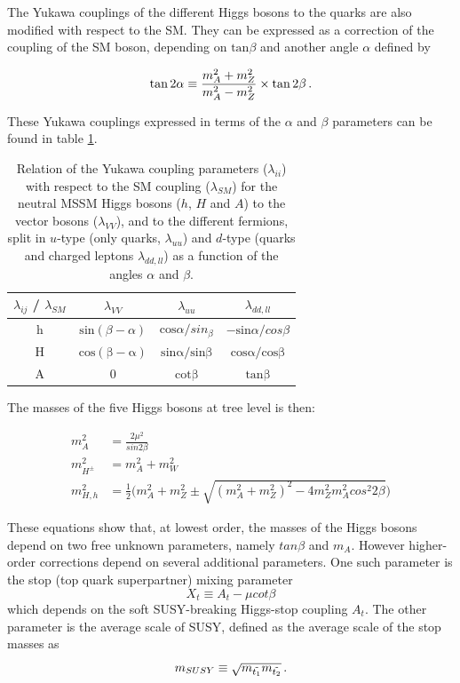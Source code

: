 The Yukawa couplings of the different Higgs bosons to the quarks are also modified with respect to the SM. They can be expressed as a correction of the coupling of the SM boson, depending on $\mathrm{tan} \beta$ and another angle $\alpha$ defined by 

\begin{equation}
    \mathrm{tan}\,2\alpha \equiv \frac{m_{A}^2 + m_{Z}^2}{m_{A}^2 - m_{Z}^2} \times \mathrm{tan}\,2\beta \mend
\end{equation}

These Yukawa couplings expressed in terms of the $\alpha$ and $\beta$ parameters can be found in table \ref{tab:yukawaMSSM}.
\begin{table}[]
    \centering
    \caption{Relation of the Yukawa coupling parameters ($\lambda_{ii}$) with respect to the SM coupling ($\lambda_{SM}$) for the neutral MSSM Higgs bosons ($h$, $H$ and $A$) to the vector bosons ($\lambda_{VV}$), and to the different fermions, split in $u$-type (only quarks, $\lambda_{uu}$) and $d$-type (quarks and charged leptons $\lambda_{dd,ll}$) as a function of the angles $\alpha$ and $\beta$.}
    \begin{tabular}{c c c c}
        $\lambda_{ij}$ / $\lambda_{SM}$ & $\lambda_{VV}$ & $\lambda_{uu}$ & $\lambda_{dd,ll}$ \\
        \hline
        h & $\mathrm{sin}(\beta - \alpha)$ & $\mathrm{cos}\alpha/sin_\beta$ & $-\mathrm{sin}\alpha / cos\beta$ \\
        H & $\mathrm{cos(\beta - \alpha)}$ & $\mathrm{sin\alpha / sin\beta}$ & $\mathrm{cos\alpha / cos \beta}$ \\
        A & 0 & $\mathrm{cot\beta}$ & $\mathrm{tan\beta}$ \\
        \hline
    \end{tabular}
    \label{tab:yukawaMSSM}
\end{table}

The masses of the five Higgs bosons at tree level is then:

\begin{align}
    m_{A}^2 &= \frac{2\mu^2}{sin 2\beta} \\
    m_{H^{\pm}}^2 &= m_{A}^2 + m_{W}^2 \\
    m_{H,h}^2 &= \frac{1}{2} \big( m_A^2 + m_Z^2 \pm \sqrt{(m_A^2 + m_Z^2)^2 - 4m_Z^2 m_A^2 cos^2 2\beta} \big)
\end{align}

These equations show that, at lowest order, the masses of the Higgs bosons depend on two free unknown parameters, namely $tan \beta$ and $m_A$. However higher-order corrections depend on several additional parameters. One such parameter is the stop (top quark superpartner) mixing parameter
\begin{equation}
    X_t \equiv A_t - \mu cot\beta
\end{equation}
which depends on the soft SUSY-breaking Higgs-stop coupling $A_t$. The other parameter is the average scale of SUSY, defined as the average scale of the stop masses as
\begin{equation}
    m_{SUSY} \equiv \sqrt{m_{\Tilde{t_1}}m_{\Tilde{t_2}}} \mend
\end{equation}

